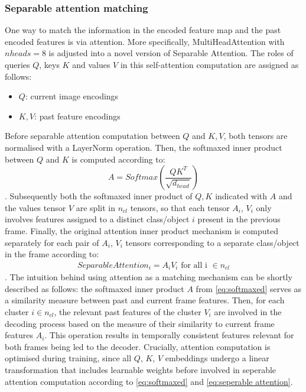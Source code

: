 \subsubsection{Separable attention matching}
One way to match the information in the encoded feature map and the past encoded features is via attention. More specifically, MultiHeadAttention with $nheads = 8$ is adjusted into a novel version of Separable Attention. The roles of queries $Q$, keys $K$ and values $V$ in this self-attention computation are assigned as follows:
\begin{itemize}
    \item $Q$: current image encodings
    \item $K,V$: past feature encodings 
\end{itemize}
Before separable attention computation between $Q$ and $K,V$, both tensors are normalised with a LayerNorm operation. Then, the  softmaxed inner product between $Q$ and $K$ is computed according to:
\begin{equation}
    \label{eq:softmaxed}
      A =  Softmax(\frac{QK^T}{\sqrt{d_{head}}}) 
\end{equation}.
Subsequently both the softmaxed inner product of $Q, K$ indicated with $A$ and the values tensor $V$ are split in $n_{cl}$ tensors, so that each tensor $A_i$, $V_i$ only involves features assigned to a distinct class/object $i$ present in the previous frame.
Finally, the original attention inner product mechanism \parencite{additiveAttention} is computed separately for each pair of $A_i$, $V_i$ tensors corresponding to a separate class/object in the frame according to:
\begin{gather}
    \label{eq:seperable attention}
    SeparableAttention_{i} = A_i V_i \text{ for all i }\in n_{cl} 
\end{gather}.
The intuition behind using attention as a matching mechanism can be shortly described as follows: the softmaxed inner product $A$ from \eqref{eq:softmaxed} serves as a similarity measure between past and current frame features. Then, for each cluster $i \in n_{cl}$, the relevant past features of the cluster $V_i$ are involved in the decoding process based on the measure of their similarity to current frame features $A_i$. This operation results in temporally consistent features relevant for both frames being led to the decoder. Crucially, attention computation is optimised during training, since all $Q$, $K$, $V$ embeddings undergo a linear transformation that includes learnable weights before involved in seperable attention computation according to \eqref{eq:softmaxed} and \eqref{eq:seperable attention}. 
\par

